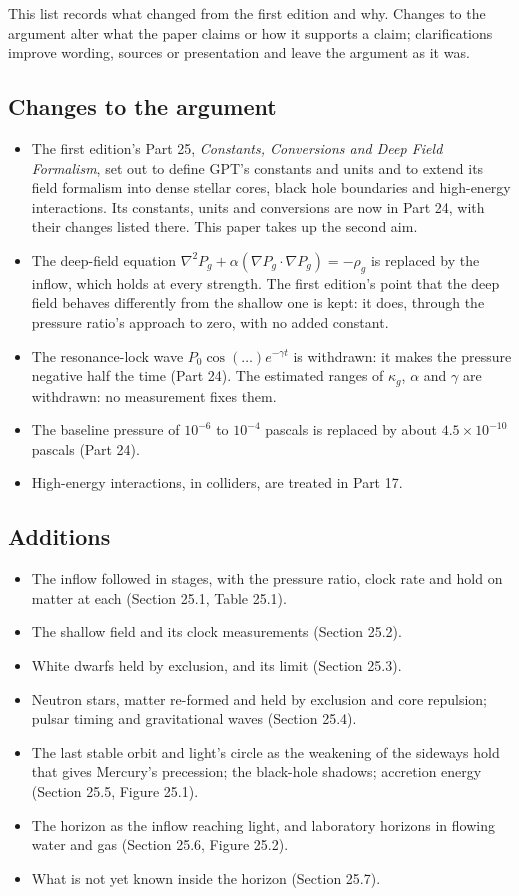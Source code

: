 This list records what changed from the first edition and why. Changes to the argument alter what the paper claims or how it supports a claim; clarifications improve wording, sources or presentation and leave the argument as it was.

\subsection*{Changes to the argument}
\begin{itemize}
\item The first edition's Part 25, \textit{Constants, Conversions and Deep Field Formalism}, set out to define GPT's constants and units and to extend its field formalism into dense stellar cores, black hole boundaries and high-energy interactions. Its constants, units and conversions are now in Part 24, with their changes listed there. This paper takes up the second aim.
\item The deep-field equation $\nabla^2 P_g + \alpha(\nabla P_g\cdot\nabla P_g) = -\rho_g$ is replaced by the inflow, which holds at every strength. The first edition's point that the deep field behaves differently from the shallow one is kept: it does, through the pressure ratio's approach to zero, with no added constant.
\item The resonance-lock wave $P_0\cos(\ldots)e^{-\gamma t}$ is withdrawn: it makes the pressure negative half the time (Part 24). The estimated ranges of $\kappa_g$, $\alpha$ and $\gamma$ are withdrawn: no measurement fixes them.
\item The baseline pressure of $10^{-6}$ to $10^{-4}$ pascals is replaced by about $4.5\times10^{-10}$ pascals (Part 24).
\item High-energy interactions, in colliders, are treated in Part 17.
\end{itemize}

\subsection*{Additions}
\begin{itemize}
\item The inflow followed in stages, with the pressure ratio, clock rate and hold on matter at each (Section 25.1, Table 25.1).
\item The shallow field and its clock measurements (Section 25.2).
\item White dwarfs held by exclusion, and its limit (Section 25.3).
\item Neutron stars, matter re-formed and held by exclusion and core repulsion; pulsar timing and gravitational waves (Section 25.4).
\item The last stable orbit and light's circle as the weakening of the sideways hold that gives Mercury's precession; the black-hole shadows; accretion energy (Section 25.5, Figure 25.1).
\item The horizon as the inflow reaching light, and laboratory horizons in flowing water and gas (Section 25.6, Figure 25.2).
\item What is not yet known inside the horizon (Section 25.7).
\end{itemize}

